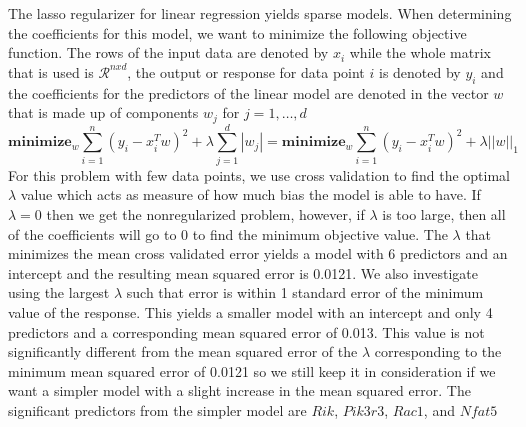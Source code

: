 \documentclass{article}
\begin{document}
The lasso regularizer for linear regression yields sparse models.  When determining the coefficients for this model, we want to minimize the following objective function.  The rows of the input data are denoted by $x_i$ while the whole matrix that is used is $\mathcal{R}^{nxd}$, the output or response for data point $i$ is denoted by $y_i$ and the coefficients for the predictors of the linear model are denoted in the vector $w$ that is made up of components $w_j$ for $j=1,\dots,d$
\begin{equation}
	\textbf{minimize}_w \sum_{i=1}^n(y_i-x_i^Tw)^2+\lambda\sum_{j=1}^d |w_j| = \textbf{minimize}_w \sum_{i=1}^n(y_i-x_i^Tw)^2+\lambda||w||_1
\end{equation}
For this problem with few data points, we use cross validation to find the optimal $\lambda$ value which acts as measure of how much bias the model is able to have.  If $\lambda = 0$ then we get the nonregularized problem, however, if $\lambda$ is too large, then all of the coefficients will go to $0$ to find the minimum objective value.  The $\lambda$ that minimizes the mean cross validated error yields a model with 6 predictors and an intercept and the resulting mean squared error is 0.0121.  We also investigate using the largest $\lambda$ such that error is within 1 standard error of the minimum value of the response.  This yields a smaller model with an intercept and only 4 predictors and a corresponding mean squared error of 0.013. This value is not significantly different from the mean squared error of the $\lambda$ corresponding to the minimum mean squared error of 0.0121 so we still keep it in consideration if we want a simpler model with a slight increase in the mean squared error.  The significant predictors from the simpler model are $Rik$, $Pik3r3$, $Rac1$, and $Nfat5$
\end{document}
